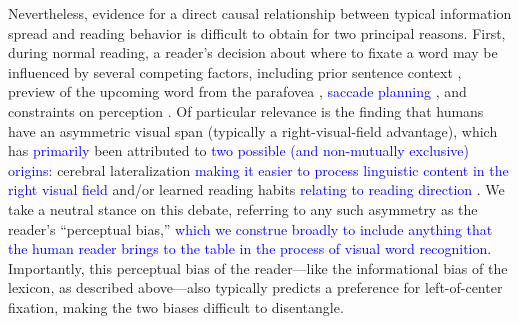 \documentclass[doc,biblatex]{apa7}
\newcommand\newmaterial[1]{\textcolor{blue}{#1}}
\begin{document}
Nevertheless, evidence for a direct causal relationship between typical information spread and reading behavior is difficult to obtain for two principal reasons. First, during normal reading, a reader's decision about where to fixate a word may be influenced by several competing factors, including prior sentence context \parencite{Balota:1985}, preview of the upcoming word from the parafovea \parencite{Hyona:1989, Underwood:1990, Schotter:2011}, \newmaterial{saccade planning \parencite{Engbert:2010, Krugel:2014, McDonald:2004}}, and constraints on perception \parencite{Bouma:1973, McConkie:1975}. Of particular relevance is the finding that humans have an asymmetric visual span (typically a right-visual-field advantage), which has \newmaterial{primarily} been attributed to \newmaterial{two possible (and non-mutually exclusive) origins:} cerebral lateralization \newmaterial{making it easier to process linguistic content in the right visual field} \parencite{Brysbaert:1988, Bub:1988, Ellis:2004, VanderHaegen:2013} and/or learned reading habits \newmaterial{relating to reading direction} \parencite{Huey:1900, Mishkin:1952, Pollatsek:1981}. We take a neutral stance on this debate, referring to any such asymmetry as the reader's ``perceptual bias,'' \newmaterial{which we construe broadly to include anything that the human reader brings to the table in the process of visual word recognition}. Importantly, this perceptual bias of the reader---like the informational bias of the lexicon, as described above---also typically predicts a preference for left-of-center fixation, making the two biases difficult to disentangle.
\end{document}

